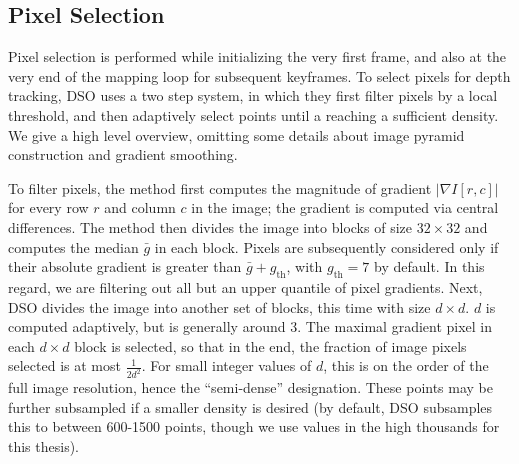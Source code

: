 \subsection{Pixel Selection}

Pixel selection is performed while initializing the very first frame, and also at the very end of the mapping loop for subsequent keyframes. To select pixels for depth tracking, DSO uses a two step system, in which they first filter pixels by a local threshold, and then adaptively select points until a reaching a sufficient density. We give a high level overview, omitting some details about image pyramid construction and gradient smoothing.

To filter pixels, the method first computes the magnitude of gradient $|\nabla I[r, c]|$ for every row $r$ and column $c$ in the image; the gradient is computed via central differences. The method then divides the image into blocks of size $32 \times 32$ and computes the median $\bar{g}$ in each block. Pixels are subsequently considered only if their absolute gradient is greater than $\bar{g} + g_\text{th}$, with $g_\text{th} = 7$ by default. In this regard, we are filtering out all but an upper quantile of pixel gradients. Next, DSO divides the image into another set of blocks, this time with size $d \times d$. $d$ is computed adaptively, but is generally around $3$. The maximal gradient pixel in each $d \times d$ block is selected, so that in the end, the fraction of image pixels selected is at most $\frac{1}{2 d^2}$. For small integer values of $d$, this is on the order of the full image resolution, hence the ``semi-dense'' designation. These points may be further subsampled if a smaller density is desired (by default, DSO subsamples this to between 600-1500 points, though we use values in the high thousands for this thesis).

%		
%		

